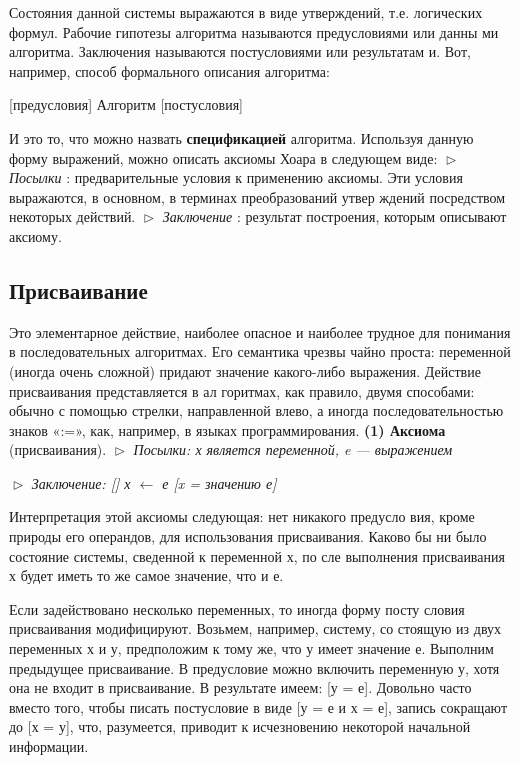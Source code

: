 Состояния данной системы выражаются в виде утверждений, т.е.
логических формул. Рабочие гипотезы алгоритма называются
предусловиями или данны ми алгоритма. Заключения называются
постусловиями или результатам и. Вот, например, способ
формального описания алгоритма:
\begin{center}
[предусловия] Алгоритм [постусловия]
\end{center}
И это то, что можно назвать \textbf{спецификацией} алгоритма. Используя 
данную форму выражений, можно описать аксиомы Хоара в следующем 
виде:
\newline
\noindent $\vartriangleright$ \textit{Посылки} : предварительные условия к применению аксиомы. Эти 
условия  выражаются,  в  основном,  в  терминах  преобразований  утвер­
ждений посредством некоторых действий.
\newline
$\vartriangleright$ \textit{Заключение} : результат построения, которым описывают аксиому.
\subsection{Присваивание}
\noindent Это элементарное  действие,  наиболее опасное  и  наиболее трудное  для 
понимания  в  последовательных  алгоритмах.  Его  семантика  чрезвы­
чайно  проста:  переменной  (иногда очень  сложной)  придают  значение 
какого-либо выражения.  Действие  присваивания  представляется  в  ал­
горитмах, как правило, двумя способами: обычно с помощью стрелки, 
направленной  влево,  а  иногда  последовательностью  знаков  «:=»,  как, 
например, в языках программирования.
\newline
\textbf{(1) Аксиома} (присваивания).
\newline
$\vartriangleright$ \textit{Посылки: х является переменной,  e  —  выражением}
\newline

\noindent $\vartriangleright$ \textit{Заключение: [] х $\leftarrow$ е [x = значению е]}
\pagebreak

\parindent=1cm Интерпретация  этой  аксиомы  следующая:  нет  никакого  предусло­
вия,  кроме  природы  его  операндов,  для  использования  присваивания. 
Каково  бы  ни  было состояние  системы,  сведенной  к  переменной х,  по­
сле выполнения присваивания х будет иметь то же самое значение,  что и е.

\parindent=1cm Если задействовано несколько переменных,  то иногда форму посту­
словия  присваивания  модифицируют.  Возьмем,  например,  систему,  со­
стоящую  из  двух  переменных х  и у,  предположим  к  тому  же,  что у
имеет значение  е.  Выполним предыдущее  присваивание. В предусловие 
можно включить  переменную у,  хотя она не  входит в присваивание.  В 
результате  имеем:  [у =   е].  Довольно часто  вместо  того,  чтобы писать 
постусловие  в  виде  [у =   е  и х  =   е],  запись  сокращают  до  [х  =   у], 
 что, разумеется,  приводит  к  исчезновению  некоторой  начальной  информа­ции.
 
